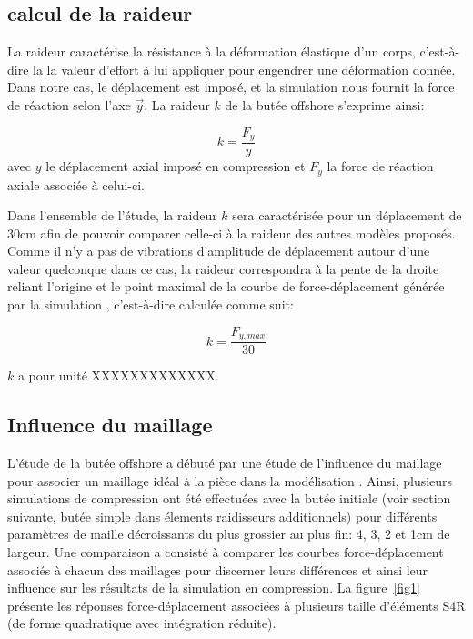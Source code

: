 ﻿ \documentclass{article}
\newcommand{\abaqus}{\bsc{Abaqus}\xspace}
\begin{document}
\subsection{calcul de la raideur}

La raideur caractérise la résistance à la déformation élastique d'un corps, c'est-à-dire la la valeur d'effort à lui appliquer pour engendrer une déformation donnée. Dans notre cas, le déplacement est imposé, et la simulation \abaqus nous fournit la force de réaction selon l'axe $\vec{y}$. La raideur $k$ de la butée offshore s'exprime ainsi:

\begin{displaymath}
		k=\frac{F_{y}}{y}
\end{displaymath}
avec $y$ le déplacement axial imposé en compression et $F_{y}$ la force de réaction axiale associée à celui-ci. 

Dans l'ensemble de l'étude, la raideur $k$ sera caractérisée pour un déplacement de 30cm afin de pouvoir comparer celle-ci à la raideur des autres modèles proposés. Comme il n'y a pas de vibrations d'amplitude de déplacement autour d'une valeur quelconque dans ce cas, la raideur correspondra à la pente de la droite reliant l'origine et le point maximal de la courbe de force-déplacement générée par la simulation \abaqus, c'est-à-dire calculée comme suit:

\begin{displaymath}
		k=\frac{F_{y,max}}{30}
\end{displaymath}

$k$ a pour unité XXXXXXXXXXXXX.


\subsection{Influence du maillage}

L'étude de la butée offshore a débuté par une étude de l'influence du maillage pour associer un maillage idéal à la pièce dans la modélisation \abaqus. Ainsi, plusieurs simulations de compression ont été effectuées avec la butée initiale (voir section suivante, butée simple dans élements raidisseurs additionnels) pour différents paramètres de maille décroissants du plus grossier au plus fin: 4, 3, 2 et 1cm de largeur.
Une comparaison a consisté à comparer les courbes force-déplacement associés à chacun des maillages pour discerner leurs différences et ainsi leur influence sur les résultats de la simulation en compression. La figure~\ref{fig1} présente les réponses force-déplacement associées à plusieurs taille d'éléments S4R (de forme quadratique avec intégration réduite).
\end{document}
